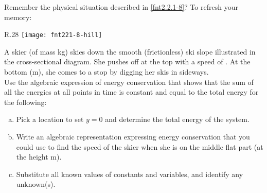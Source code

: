 \label{fnt2.3.1-3}

Remember the physical situation described in \ref{fnt2.2.1-8}? To refresh your memory:\\

\begin{wrapfigure}{R}{.28\textwidth}
	\vspace{-15pt}
  	\centering
	\texttt{[image: fnt221-8-hill]}
	\vspace{-10pt}
\end{wrapfigure}

\noindent A skier (of mass \unit[55]{kg}) skies down the smooth (frictionless) ski slope illustrated in the cross-sectional diagram. She pushes off at the top with a speed of . At the bottom (\unit[0]{m}), she comes to a stop by digging her skis in sideways.\\

\noindent Use the algebraic expression of energy conservation that shows that the sum of all the energies at all points in time is constant and equal to the total energy for the following:

\begin{enumerate}[(a)]

	\item Pick a location to set $y = 0$ and determine the total energy of the system.
	\item Write an algebraic representation expressing energy conservation that you could use to find the speed of the skier when she is on the middle flat part (at the height \unit[10]{m}).
	\item Substitute all known values of constants and variables, and identify any unknown(s).
	
\end{enumerate}
